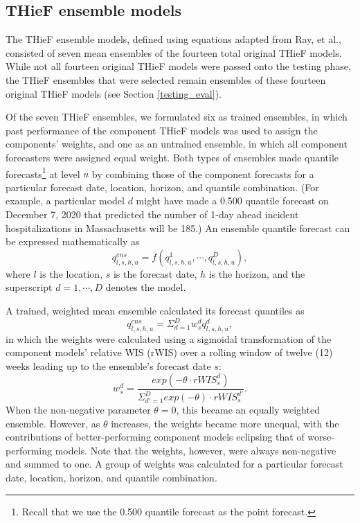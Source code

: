 \documentclass[thesis]{umassthesis}  %
\begin{document}
\subsection{THieF ensemble models} \label{thief_ensembles}
The THieF ensemble models, defined using equations adapted from Ray, et al.\cite{ensemble_methods}, consisted of seven mean ensembles of the fourteen total original THieF models. While not all fourteen original THieF models were passed onto the testing phase, the THieF ensembles that were selected remain ensembles of these fourteen original THieF models (see Section \ref{testing_eval}).

Of the seven THieF ensembles, we formulated six as trained ensembles, in which past performance of the component THieF models was used to assign the components' weights, and one as an untrained ensemble, in which all component forecasters were assigned equal weight\cite{ensemble_methods}. Both types of ensembles made quantile forecasts\footnote{Recall that we use the 0.500 quantile forecast as the point forecast.} at level $u$ by combining those of the component forecasts for a particular forecast date, location, horizon, and quantile combination. (For example, a particular model $d$ might have made a 0.500 quantile forecast on December 7, 2020 that predicted the number of 1-day ahead incident hospitalizations in Massachusetts will be 185.) An ensemble quantile forecast can be expressed mathematically as \[q_{l,s,h,u}^{ens} = f(q_{l,s,h,u}^1, \cdots, q_{l,s,h,u}^D),\] where $l$ is the location, $s$ is the forecast date, $h$ is the horizon, and the superscript $d = 1, \cdots, D$ denotes the model\cite{ensemble_methods}.

A trained, weighted mean ensemble calculated its forecast quantiles as \[q_{l,s,h,u}^{ens} = \Sigma_{d=1}^D w_s^d q_{l,s,h,u}^d,\] in which the weights were calculated using a sigmoidal transformation of the component models' relative WIS (rWIS) over a rolling window of twelve (12) weeks leading up to the ensemble's forecast date $s$: \[w_s^d=\frac{exp(-\theta \cdot rWIS_s^d)}{\Sigma_{d'=1}^D exp(-\theta) \cdot rWIS_s^{d'}}.\] When the non-negative parameter $\theta = 0$, this became an equally weighted ensemble. However, as $\theta$ increases, the weights became more unequal, with the contributions of better-performing component models eclipsing that of worse-performing models. Note that the weights, however, were always non-negative and summed to one. A group of weights was calculated for a particular forecast date, location, horizon, and quantile combination\cite{ensemble_methods}.
\end{document}
